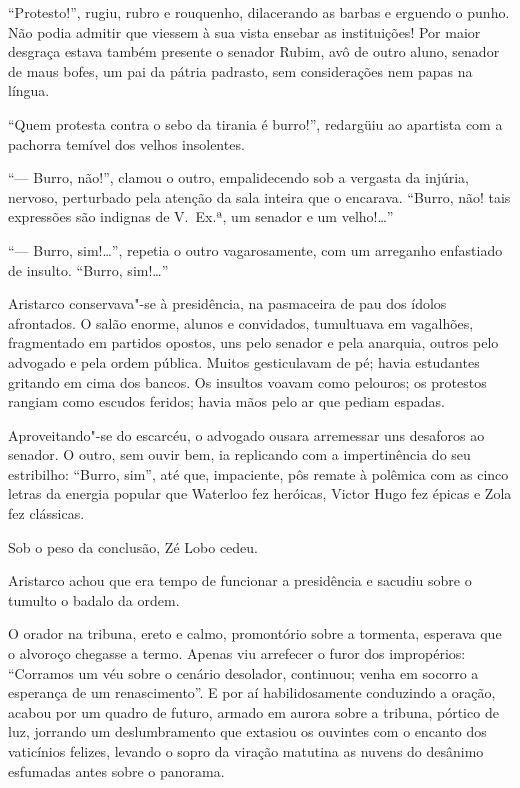 ``Protesto!'', rugiu, rubro e rouquenho, dilacerando
as barbas e erguendo o punho. Não podia admitir que viessem à sua vista
ensebar as instituições! Por maior desgraça estava também presente o
senador Rubim, avô de outro aluno, senador de maus bofes, um pai da
pátria padrasto, sem considerações nem papas na língua. 

``Quem protesta contra o sebo da tirania é burro!'', redargüiu ao apartista com a
pachorra temível dos velhos insolentes. 

``--- Burro, não!'', clamou o
outro, empalidecendo sob a vergasta da injúria, nervoso, perturbado
pela atenção da sala inteira que o encarava. ``Burro, não! tais
expressões são indignas de V.~Ex.ª, um senador e um velho!\ldots{}'' 

``--- Burro, sim!\ldots{}'', repetia o outro vagarosamente, com um arreganho
enfastiado de insulto. ``Burro, sim!\ldots{}''

Aristarco conservava"-se à
presidência, na pasmaceira de pau dos ídolos afrontados. O salão
enorme, alunos e convidados, tumultuava em vagalhões, fragmentado em
partidos opostos, uns pelo senador e pela anarquia, outros pelo
advogado e pela ordem pública. Muitos gesticulavam de pé; havia
estudantes gritando em cima dos bancos. Os insultos voavam como
pelouros; os protestos rangiam como escudos feridos; havia mãos pelo ar
que pediam espadas. 

Aproveitando"-se do escarcéu, o advogado ousara
arremessar uns desaforos ao senador. O outro, sem ouvir bem, ia
replicando com a impertinência do seu estribilho: ``Burro, sim'', até
que, impaciente, pôs remate à polêmica com as cinco letras da energia
popular que Waterloo fez heróicas, Victor Hugo fez épicas e Zola fez
clássicas. 

Sob o peso da conclusão, Zé Lobo cedeu. 

Aristarco achou que
era tempo de funcionar a presidência e sacudiu sobre o tumulto o badalo
da ordem. 

O orador na tribuna, ereto e calmo, promontório sobre a
tormenta, esperava que o alvoroço chegasse a termo. Apenas viu
arrefecer o furor dos impropérios: ``Corramos um véu sobre o cenário
desolador, continuou; venha em socorro a esperança de um renascimento''.
E por aí habilidosamente conduzindo a oração, acabou por um quadro de
futuro, armado em aurora sobre a tribuna, pórtico de luz, jorrando um
deslumbramento que extasiou os ouvintes com o encanto dos vaticínios
felizes, levando o sopro da viração matutina as nuvens do desânimo
esfumadas antes sobre o panorama. 

